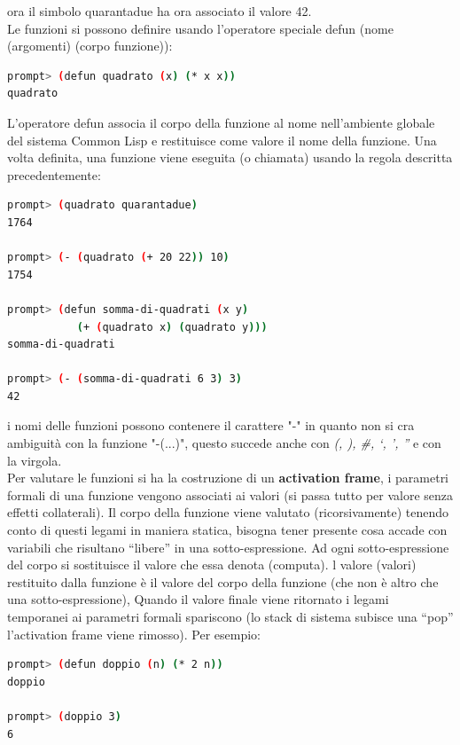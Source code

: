 \documentclass[a4paper,12pt, oneside]{book}
\begin{document}
ora il simbolo quarantadue ha ora associato il valore 42.\\
Le funzioni si possono definire usando l’operatore speciale defun (nome (argomenti) (corpo funzione)):
\begin{shaded}
\begin{lstlisting}[language=bash]
prompt> (defun quadrato (x) (* x x))
quadrato
\end{lstlisting}
\end{shaded}
L'operatore defun associa il corpo della funzione al nome
nell’ambiente globale del sistema Common Lisp e restituisce come valore il nome della funzione. Una volta definita, una funzione viene eseguita (o chiamata) usando la regola descritta precedentemente:
\begin{shaded}
\begin{lstlisting}[language=bash]
prompt> (quadrato quarantadue)
1764

prompt> (- (quadrato (+ 20 22)) 10)
1754

prompt> (defun somma-di-quadrati (x y)
           (+ (quadrato x) (quadrato y)))
somma-di-quadrati

prompt> (- (somma-di-quadrati 6 3) 3)
42
\end{lstlisting}
\end{shaded}
i nomi delle funzioni possono contenere il carattere "-" in quanto non si cra ambiguità con la funzione "-(...)", questo succede anche con \textit{(, ), \#, ‘, ’, ”} e con la virgola.\\
Per valutare le funzioni si ha la costruzione di un \textbf{activation frame}, i parametri formali di una funzione vengono associati ai valori (si passa tutto per valore senza effetti collaterali). Il corpo della funzione viene valutato (ricorsivamente) tenendo conto di questi legami in maniera statica, bisogna tener presente cosa accade con variabili che risultano
“libere” in una sotto-espressione. Ad ogni sotto-espressione del corpo si sostituisce il valore che essa denota (computa). l valore (valori) restituito dalla funzione è il valore del corpo della funzione (che non è altro che una sotto-espressione), Quando il valore finale viene ritornato i legami temporanei ai parametri formali spariscono (lo stack di sistema subisce una “pop” l’activation frame viene rimosso). Per esempio:
\begin{shaded}
\begin{lstlisting}[language=bash]
prompt> (defun doppio (n) (* 2 n))
doppio

prompt> (doppio 3)
6
\end{lstlisting}
\end{shaded}
\end{document}
